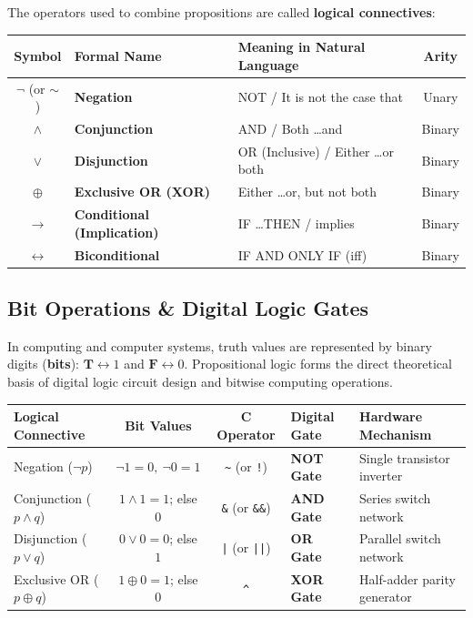 \documentclass[11pt,a4paper]{article}
\begin{document}
\begin{defbox}
The operators used to combine propositions are called \textbf{logical connectives}:
\begin{center}
\renewcommand{\arraystretch}{1.2}
\begin{tabular}{c l l c}
\toprule
\textbf{Symbol} & \textbf{Formal Name} & \textbf{Meaning in Natural Language} & \textbf{Arity} \\
\midrule
$\neg$ (or $\sim$) & \textbf{Negation} & NOT / It is not the case that & Unary \\
$\wedge$ & \textbf{Conjunction} & AND / Both \dots and & Binary \\
$\vee$ & \textbf{Disjunction} & OR (Inclusive) / Either \dots or both & Binary \\
$\oplus$ & \textbf{Exclusive OR (XOR)} & Either \dots or, but not both & Binary \\
$\rightarrow$ & \textbf{Conditional (Implication)} & IF \dots THEN / implies & Binary \\
$\leftrightarrow$ & \textbf{Biconditional} & IF AND ONLY IF (iff) & Binary \\
\bottomrule
\end{tabular}
\end{center}
\end{defbox}

\subsection{Bit Operations \& Digital Logic Gates}
In computing and computer systems, truth values are represented by binary digits (\textbf{bits}): $\mathbf{T} \leftrightarrow 1$ and $\mathbf{F} \leftrightarrow 0$. Propositional logic forms the direct theoretical basis of digital logic circuit design and bitwise computing operations.

\begin{theorembox}
\renewcommand{\arraystretch}{1.2}
\small
\begin{tabularx}{\linewidth}{@{}l c c l X@{}}
\toprule
\textbf{Logical Connective} & \textbf{Bit Values} & \textbf{C Operator} & \textbf{Digital Gate} & \textbf{Hardware Mechanism} \\
\midrule
Negation ($\neg p$) & $\neg 1 = 0, \ \neg 0 = 1$ & \texttt{\~{}} (or \texttt{!}) & \textbf{NOT Gate} & Single transistor inverter \\
Conjunction ($p \wedge q$) & $1 \wedge 1 = 1$; else $0$ & \texttt{\&} (or \texttt{\&\&}) & \textbf{AND Gate} & Series switch network \\
Disjunction ($p \vee q$) & $0 \vee 0 = 0$; else $1$ & \texttt{|} (or \texttt{||}) & \textbf{OR Gate} & Parallel switch network \\
Exclusive OR ($p \oplus q$) & $1 \oplus 0 = 1$; else $0$ & \texttt{\^{}} & \textbf{XOR Gate} & Half-adder parity generator \\
\bottomrule
\end{tabularx}
\end{theorembox}
\end{document}
